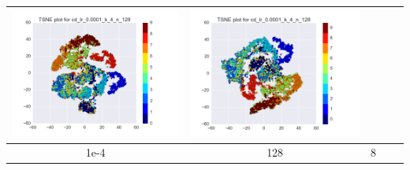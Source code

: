 \documentclass[12pt]{report}
\begin{document}
\begin{table}[H]
\begin{tabular}{ | c | c | c | c || c |}
\begin{minipage}{.3\textwidth}
      \includegraphics[scale=0.25]{cd_lr_0_0001_k_4_n_128.png}
    \end{minipage} &
    \begin{minipage}{.3\textwidth}
      \includegraphics[scale=0.25]{test_cd_lr_0_0001_k_4_n_128.png}
    \end{minipage}
        \\ \hline
    1e-4 & 128 & 8 &
    \begin{minipage}{.3\textwidth}

\end{minipage}
\end{tabular}
\end{table}
\end{document}
